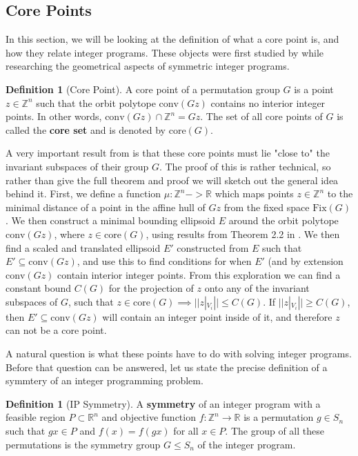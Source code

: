 \documentclass[11pt]{article} %
\theoremstyle{definition}
\newtheorem{definition}[theorem]{Definition}
\theoremstyle{remark}
\newcommand{\ZZ}{\mathbb{Z}}
\newcommand{\RR}{\mathbb{R}}
\begin{document}
\subsection{Core Points}

In this section, we will be looking at the definition of what a core point is, and how they relate integer programs. These objects were first studied by \cite{some} while researching the geometrical aspects of symmetric integer programs.

\begin{definition}[Core Point]
A core point of a permutation group $G$ is a point $z \in \mathbb{Z}^n$ such that the orbit polytope $\textrm{conv}(Gz)$ contains no interior integer points. In other words, $\textrm{conv}(Gz) \cap \mathbb{Z}^n = Gz$. The set of all core points of $G$ is called the \textbf{core set} and is denoted by $\textrm{core}(G)$.
\end{definition}

A very important result from \cite{rehn} is that these core points must lie "close to" the invariant subspaces of their group $G$. The proof of this is rather technical, so rather than give the full theorem and proof we will sketch out the general idea behind it. First, we define a function $\mu : \ZZ^n -> \RR$ which maps points $z \in \ZZ^n$ to the minimal distance of a point in the affine hull of $Gz$ from the fixed space $\textrm{Fix}(G)$. We then construct a minimal bounding ellipsoid $E$ around the orbit polytope $\textrm{conv}(Gz)$, where $z \in \textrm{core}(G)$, using results from Theorem 2.2 in \cite{barvinok/blekherman}. We then find a scaled and translated ellipsoid $E'$ constructed from $E$ such that $E' \subseteq \textrm{conv}(Gz)$, and use this to find conditions for when $E'$ (and by extension $\textrm{conv}(Gz)$ contain interior integer points. From this exploration we can find a constant bound $C(G)$ for the projection of $z$ onto any of the invariant subspaces of $G$, such that $z \in \textrm{core}(G) \implies  ||z|_{V_i}|| \leq C(G)$. If $||z|_{V_i}|| \geq C(G)$, then $E' \subseteq \textrm{conv}(Gz)$ will contain an integer point inside of it, and therefore $z$ can not be a core point.

A natural question is what these points have to do with solving integer programs. Before that question can be answered, let us state the precise definition of a symmtery of an integer programming problem. 

\begin{definition}[IP Symmetry]
A \textbf{symmetry} of an integer program with a feasible region $P \subset \RR^n$ and objective function $f : \ZZ^n \rightarrow \RR$ is a permutation $g \in S_n$ such that $gx \in P$ and $f(x) = f(gx)$ for all $x \in P$. The group of all these permutations is the symmetry group $G \leq S_n$ of the integer program.
\end{definition}
\end{document}
